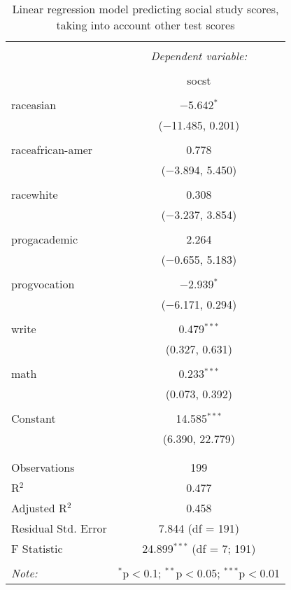 
\begin{table}[!htbp] \centering 
  \caption{Linear regression model predicting social study scores, taking into 
          account other test scores} 
  \label{tab::lm_socst_peeking} 
\begin{tabular}{@{\extracolsep{5pt}}lc} 
\\[-1.8ex]\hline 
\hline \\[-1.8ex] 
 & \multicolumn{1}{c}{\textit{Dependent variable:}} \\ 
\cline{2-2} 
\\[-1.8ex] & socst \\ 
\hline \\[-1.8ex] 
 raceasian & $-$5.642$^{*}$ \\ 
  & ($-$11.485, 0.201) \\ 
  & \\ 
 raceafrican-amer & 0.778 \\ 
  & ($-$3.894, 5.450) \\ 
  & \\ 
 racewhite & 0.308 \\ 
  & ($-$3.237, 3.854) \\ 
  & \\ 
 progacademic & 2.264 \\ 
  & ($-$0.655, 5.183) \\ 
  & \\ 
 progvocation & $-$2.939$^{*}$ \\ 
  & ($-$6.171, 0.294) \\ 
  & \\ 
 write & 0.479$^{***}$ \\ 
  & (0.327, 0.631) \\ 
  & \\ 
 math & 0.233$^{***}$ \\ 
  & (0.073, 0.392) \\ 
  & \\ 
 Constant & 14.585$^{***}$ \\ 
  & (6.390, 22.779) \\ 
  & \\ 
\hline \\[-1.8ex] 
Observations & 199 \\ 
R$^{2}$ & 0.477 \\ 
Adjusted R$^{2}$ & 0.458 \\ 
Residual Std. Error & 7.844 (df = 191) \\ 
F Statistic & 24.899$^{***}$ (df = 7; 191) \\ 
\hline 
\hline \\[-1.8ex] 
\textit{Note:}  & \multicolumn{1}{r}{$^{*}$p$<$0.1; $^{**}$p$<$0.05; $^{***}$p$<$0.01} \\ 
\end{tabular} 
\end{table} 
